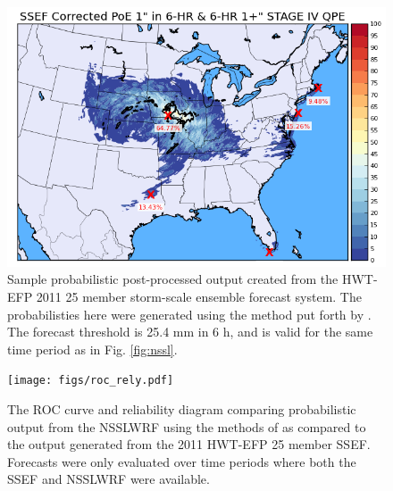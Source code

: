 \begin{figure}
    \begin{center}
        \includegraphics[scale=0.50]{figs/ssef.png}
        \caption{\small Sample probabilistic post-processed output created from the HWT-EFP 2011 25 member storm-scale ensemble forecast system. The probabilisties here were generated using the method put forth by \cite{hamill1998eps}. The forecast threshold is 25.4 mm in 6 h, and is valid for the same time period as in Fig. \ref{fig:nssl}.}
        \label{fig:ssef}
    \end{center}
\end{figure}


\begin{figure}
    \begin{center}
        \texttt{[image: figs/roc\_rely.pdf]}
        \caption{\small The ROC curve and reliability diagram comparing probabilistic output from the NSSLWRF using the methods of \cite{marsh2012calibration} as compared to the output generated from the 2011 HWT-EFP 25 member SSEF. Forecasts were only evaluated over time periods where both the SSEF and NSSLWRF were available.}
        \label{fig:roc rely}
    \end{center}
\end{figure}